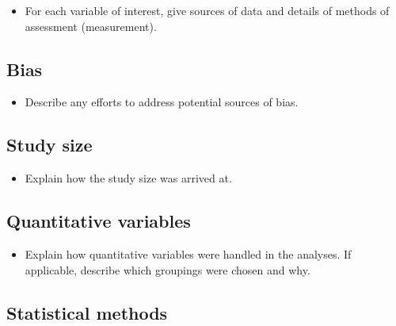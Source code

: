 \documentclass[
  letterpaper,
  DIV=11,
  numbers=noendperiod]{scrartcl}
\providecommand{\tightlist}{%
  \setlength{\itemsep}{0pt}\setlength{\parskip}{0pt}}\usepackage{longtable,booktabs,array}
\begin{document}
\begin{itemize}
\tightlist
\item
  For each variable of interest, give sources of data and details of
  methods of assessment (measurement).
\end{itemize}

\subsection{Bias}\label{sec-bias}

\begin{itemize}
\tightlist
\item
  Describe any efforts to address potential sources of bias.
\end{itemize}

\subsection{Study size}\label{sec-size}

\begin{itemize}
\tightlist
\item
  Explain how the study size was arrived at.
\end{itemize}

\subsection{Quantitative variables}\label{sec-quant-vars}

\begin{itemize}
\tightlist
\item
  Explain how quantitative variables were handled in the analyses. If
  applicable, describe which groupings were chosen and why.
\end{itemize}

\subsection{Statistical methods}\label{sec-stat-methods}
\end{document}
